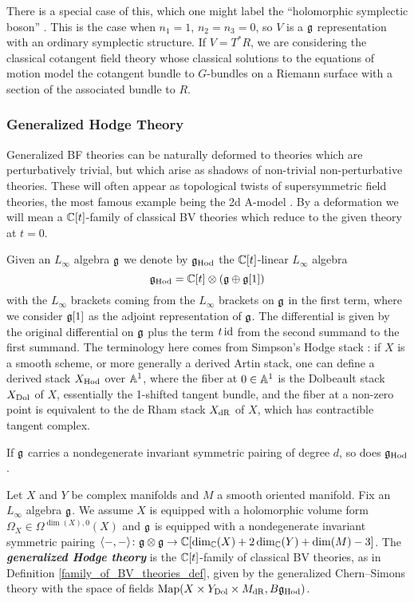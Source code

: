\documentclass[10pt, oneside]{article}
\newcommand{\Hod}{\mathrm{Hod}}
\newcommand{\defterm}[1]{\textbf{\emph{#1}}}
\begin{document}
\begin{example}
There is a special case of this, which one might label the ``holomorphic symplectic boson'' \cite[Definition 4.8]{SWchar}.  This is the case when $n_1 = 1$, $n_2 = n_3 = 0$, so $V$ is a $\mathfrak g$ representation with an ordinary symplectic structure.  If $V = T^*R$, we are considering the classical cotangent field theory whose classical solutions to the equations of motion model the cotangent bundle to $G$-bundles on a Riemann surface with a section of the associated bundle to $R$.
\end{example}

\subsubsection{Generalized Hodge Theory}
Generalized BF theories can be naturally deformed to theories which are perturbatively trivial, but which arise as shadows of non-trivial non-perturbative theories.  These will often appear as topological twists of supersymmetric field theories, the most famous example being the 2d A-model . By a deformation we will mean a $\mathbb C[t]$-family of classical BV theories which reduce to the given theory at $t=0$.

Given an $L_\infty$ algebra $\mathfrak g$ we denote by $\fg_{\Hod}$ the $\mathbb C[t]$-linear $L_\infty$ algebra
\[\fg_{\Hod} = \CC[t]\otimes (\fg\oplus \fg[1])\]
with the $L_\infty$ brackets coming from the $L_\infty$ brackets on $\mathfrak g$ in the first term, where we consider $\mathfrak g[1]$ as the adjoint representation of $\mathfrak g$. The differential is given by the original differential on $\mathfrak g$ plus the term $t\operatorname{id}$ from the second summand to the first summand.  The terminology here comes from Simpson's Hodge stack \cite{Simpson}: if $X$ is a smooth scheme, or more generally a derived Artin stack, one can define a derived stack $X_{\mathrm{Hod}}$ over $\mathbb{A}^1$, where the fiber at $0 \in \mathbb{A}^1$ is the Dolbeault stack $X_{\mathrm{Dol}}$ of $X$, essentially the 1-shifted tangent bundle, and the fiber at a non-zero point is equivalent to the de Rham stack $X_{\mathrm{dR}}$ of $X$, which has contractible tangent complex.

If $\mathfrak g$ carries a nondegenerate invariant symmetric pairing of degree $d$, so does $\fg_{\Hod}$.

\begin{definition} \label{Hodge_family_def}
Let $X$ and $Y$ be complex manifolds and $M$ a smooth oriented manifold. Fix an $L_\infty$ algebra $\mathfrak g$. We assume $X$ is equipped with a holomorphic volume form $\Omega_X \in\Omega^{\dim(X), 0}(X)$ and $\mathfrak g$ is equipped with a nondegenerate invariant symmetric pairing $\langle-, -\rangle\colon \mathfrak g\otimes\mathfrak g\rightarrow \mathbb C[\dim_\mathbb C(X) + 2\dim_\mathbb C(Y) + \dim(M) - 3]$. The \defterm{generalized Hodge theory} is the $\mathbb C[t]$-family of classical BV theories, as in Definition \ref{family_of_BV_theories_def}, given by the generalized Chern--Simons theory with the space of fields $\map(X\times Y_{\mr{Dol}}\times M_{\mr{dR}}, B \fg_\Hod)$.
\end{definition}
\end{document}

